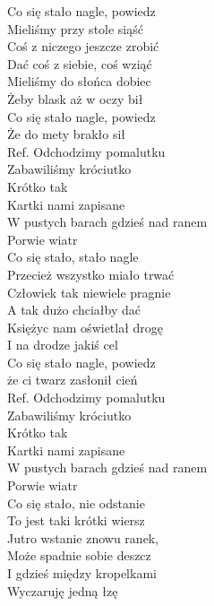 
Co się stało nagle, powiedz \\
Mieliśmy przy stole siąść \\
Coś z niczego jeszcze zrobić \\
Dać coś z siebie, coś wziąć \\
Mieliśmy do słońca dobiec \\
Żeby blask aż w oczy bił \\
Co się stało nagle, powiedz \\
Że do mety brakło sił \\
\hops
Ref. Odchodzimy pomalutku \tab{}\\
 Zabawiliśmy króciutko \tab{} \\
 Krótko tak \tab{}\\
 Kartki nami zapisane \tab{}\\
 W pustych barach gdzieś nad ranem \\
 Porwie wiatr \tab{}\\
\hops
Co się stało, stało nagle \\
Przecież wszystko miało trwać \\
Człowiek tak niewiele pragnie \\
A tak dużo chciałby dać \\
Księżyc nam oświetlał drogę \\
I na drodze jakiś cel \\
Co się stało nagle, powiedz \\
że ci twarz zasłonił cień \\
\hops
Ref. Odchodzimy pomalutku\\
 Zabawiliśmy króciutko  \\
 Krótko tak \\
 Kartki nami zapisane \\
 W pustych barach gdzieś nad ranem \\
 Porwie wiatr \\
\hops
Co się stało, nie odstanie \\
To jest taki krótki wiersz \\
Jutro wstanie znowu ranek, \\
Może spadnie sobie deszcz \\
I gdzieś między kropelkami \\
Wyczaruję jedną łzę \\
